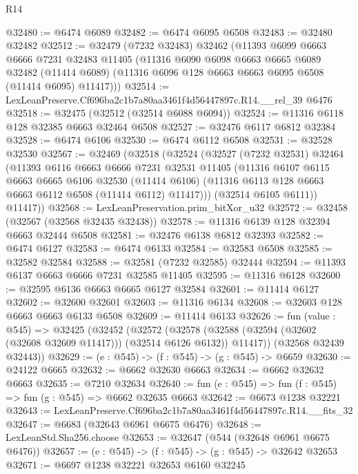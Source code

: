 \begin{lexlean}{R14}
\begin{coremodule}
@32480 := @6474 @6089
@32482 := @6474 @6095 @6508
@32483 := @32480 @32482
@32512 := @32479
    (@7232 @32483)
    @32462
    (@11393
      @6099
      @6663
      @6666
      @7231
      @32483
      @11405
      (@11316
        @6090
        @6098
        @6663
        @6665
        @6089
        @32482
        (@11414 @6089)
        (@11316 @6096 @128 @6663 @6663 @6095 @6508 (@11414 @6095) @11417)))
@32514 := LexLeanPreserve.Cf696ba2c1b7a80aa3461f4d56447897c.R14.__rel_39 @6476
@32518 := @32475 (@32512 (@32514 @6088 @6094))
@32524 := @11316 @6118 @128 @32385 @6663 @32464 @6508
@32527 := @32476 @6117 @6812 @32384
@32528 := @6474 @6106
@32530 := @6474 @6112 @6508
@32531 := @32528 @32530
@32567 := @32469
    (@32518
      (@32524
        (@32527
          (@7232 @32531)
          @32464
          (@11393
            @6116
            @6663
            @6666
            @7231
            @32531
            @11405
            (@11316
              @6107
              @6115
              @6663
              @6665
              @6106
              @32530
              (@11414 @6106)
              (@11316 @6113 @128 @6663 @6663 @6112 @6508 (@11414 @6112) @11417)))
          (@32514 @6105 @6111))
        @11417))
@32568 := LexLeanPreservation.prim_bitXor_u32
@32572 := @32458 (@32567 (@32568 @32435 @32438))
@32578 := @11316 @6139 @128 @32394 @6663 @32444 @6508
@32581 := @32476 @6138 @6812 @32393
@32582 := @6474 @6127
@32583 := @6474 @6133
@32584 := @32583 @6508
@32585 := @32582 @32584
@32588 := @32581 (@7232 @32585) @32444
@32594 := @11393 @6137 @6663 @6666 @7231 @32585 @11405
@32595 := @11316 @6128
@32600 := @32595 @6136 @6663 @6665 @6127 @32584
@32601 := @11414 @6127
@32602 := @32600 @32601
@32603 := @11316 @6134
@32608 := @32603 @128 @6663 @6663 @6133 @6508
@32609 := @11414 @6133
@32626 := fun (value : @545) =>
  @32425
    (@32452
      (@32572
        (@32578 (@32588 (@32594 (@32602 (@32608 @32609 @11417))) (@32514 @6126 @6132)) @11417))
      (@32568 @32439 @32443))
@32629 := (e : @545) -> (f : @545) -> (g : @545) -> @6659
@32630 := @24122 @6665
@32632 := @6662 @32630 @6663
@32634 := @6662 @32632 @6663
@32635 := @7210 @32634
@32640 := fun (e : @545) => fun (f : @545) => fun (g : @545) => @6662 @32635 @6663
@32642 := @6673 @1238 @32221
@32643 := LexLeanPreserve.Cf696ba2c1b7a80aa3461f4d56447897c.R14.__fits_32
@32647 := @6683 (@32643 @6961 @6675 @6476)
@32648 := LexLeanStd.Sha256.choose
@32653 := @32647 (@544 (@32648 @6961 @6675 @6476))
@32657 := (e : @545) -> (f : @545) -> (g : @545) -> @32642 @32653
@32671 := @6697
    @1238
    @32221
    @32653
    @6160
    @32245

\end{coremodule}
\end{lexlean}
